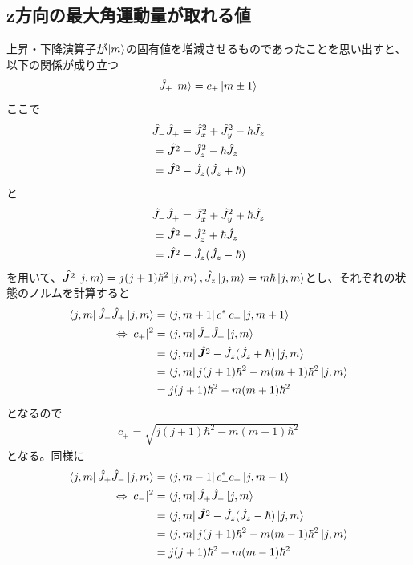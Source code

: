 \documentclass{jsarticle}  %
\numberwithin{equation}{section} %
\numberwithin{figure}{section}
\begin{document}
\subsection{z方向の最大角運動量が取れる値}
    上昇・下降演算子が$\ket{m}$の固有値を増減させるものであったことを思い出すと、以下の関係が成り立つ
    \begin{align}
        \hat{J}_{\pm} \ket{m} = c_{\pm} \ket{m \pm 1}
    \end{align}
    ここで
    \begin{align}
        &\hat{J}_- \hat{J}_+ = \hat{J}_x^2 + \hat{J}_y^2 - \hbar \hat{J}_z \notag \\
        &= \hat{\bm{J}^2} - \hat{J}_z^2 - \hbar \hat{J}_z \notag \\
        &= \hat{\bm{J}^2} - \hat{J}_z(\hat{J}_z + \hbar) \notag \\
    \end{align}
    と
    \begin{align}
        &\hat{J}_- \hat{J}_+ = \hat{J}_x^2 + \hat{J}_y^2 + \hbar \hat{J}_z \notag \\
        &= \hat{\bm{J}^2} - \hat{J}_z^2 + \hbar \hat{J}_z \notag \\
        &= \hat{\bm{J}^2} - \hat{J}_z(\hat{J}_z - \hbar) \notag \\
    \end{align}
    を用いて、$\hat{\bm{J}^2} \ket{j,m} = j(j+1)\hbar^2\ket{j,m}, \hat{J}_z \ket{j,m} = m\hbar \ket{j,m}$とし、それぞれの状態のノルムを計算すると
    \begin{align}
        \bra{j,m} \hat{J}_- \hat{J}_+ \ket{j,m} &= \bra{j,m+1} c_+^* c_+ \ket{j,m+1} \notag \\
        \Leftrightarrow |c_+|^2 &= \bra{j,m} \hat{J}_- \hat{J}_+ \ket{j,m} \notag \\
        &= \bra{j,m} \hat{\bm{J}^2} - \hat{J}_z(\hat{J}_z + \hbar) \ket{j,m} \notag \\
        &= \bra{j,m} j(j+1)\hbar^2 - m(m + 1)\hbar^2 \ket{j,m} \notag \\
        &= j(j+1)\hbar^2 - m(m + 1)\hbar^2 
    \end{align}
    となるので
    \begin{align}
        c_+ = \sqrt{j(j+1)\hbar^2 - m(m + 1)\hbar^2 }
    \end{align}
    となる。同様に
    \begin{align}
        \bra{j,m} \hat{J}_+ \hat{J}_- \ket{j,m} &= \bra{j,m-1} c_+^* c_+ \ket{j,m-1} \notag \\
        \Leftrightarrow |c_-|^2 &= \bra{j,m} \hat{J}_+ \hat{J}_- \ket{j,m} \notag \\
        &= \bra{j,m} \hat{\bm{J}^2} - \hat{J}_z(\hat{J}_z - \hbar) \ket{j,m} \notag \\
        &= \bra{j,m} j(j+1)\hbar^2 - m(m - 1)\hbar^2 \ket{j,m} \notag \\
        &= j(j+1)\hbar^2 - m(m - 1)\hbar^2 
    \end{align}
\end{document}
